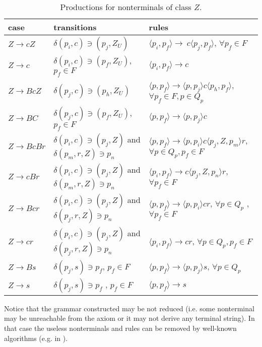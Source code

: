 \documentclass[3p,11pt]{elsarticle}
\begin{document}
\begin{table}[h!]
\caption{\label{productionsZ}Productions for  nonterminals of class $Z$. }
\renewcommand{\arraystretch}{1.3}
\begin{tabular}{l|p{}|p{7cm}}
  case & transitions  & rules \\
  \hline
 $Z\to c Z$ & $\delta(p_i, c)\ni (p_j,Z_U)$ & $\langle p_i, p_f\rangle\to \ c \langle p_j, p_f\rangle$, ${\forall p_f \in F}$ \\

 $Z\to c$ & $\delta(p_i, c)\ni (p_f,Z_U)$, $p_f \in F$ &  $\langle p_i, p_f\rangle\to c$\\

 $Z\to B c Z$      & $\delta(p_j, c)\ni (p_h,Z_U)$ & $\langle p, p_f\rangle\to \langle p, p_j\rangle c \langle p_h, p_f\rangle$, ${\forall p_f\in F, p\in Q_p}$
     \\

  $Z\to B C$    & $\delta(p_j, c)\ni (p_f,Z_U)$, $p_f \in F$  & $\langle p, p_f\rangle\to \langle p, p_j\rangle c$ \\

   $Z\to BcBr$ & $\delta(p_i, c)\ni (p_j, Z)$ and $\delta(p_m, r, Z)\ni p_n$
                   & $\langle p,p_f \rangle  \to \langle p,p_i \rangle c \langle p_j, Z, p_m\rangle r$, ${\forall p \in Q_p,  p_f\in F}$\\


   $Z\to cBr$   &   $\delta(p_i, c)\ni (p_j, Z)$ and $\delta(p_m, r, Z)\ni p_n$
                        & $\langle p_i,p_f \rangle  \to c \langle p_j, Z,p_n \rangle r $, ${\forall p_f\in F}$\\

   $Z\to Bcr$   &   $\delta(p_i, c)\ni (p_j, Z)$ and $\delta(p_j, r, Z)\ni p_n$
                        & $\langle p,p_f \rangle  \to \langle p,p_i \rangle c  r $, ${\forall p \in Q_p}$ , $\forall p_f\in F$\\

  $Z\to cr$   & $\delta(p_i, c)\ni (p_j, Z)$ and $\delta(p_j, r, Z)\ni p_n$
                      & $\langle p_i,p_f \rangle  \to  c  r $, ${\forall p \in Q_p, p_f\in F}$ \\

   $Z\to B s$    &  $\delta(p_j, s)\ni p_f$, $p_f \in F$    &   $\langle p, p_f\rangle\to \langle p, p_j\rangle s$, ${\forall p\in Q_p}$  \\

   $Z\to s$    &   $\delta(p_j, s)\ni p_f$ , $p_f \in F$        &   $\langle p, p_f\rangle\to  s$ \\
\hline
\end{tabular}
\end{table}
 Notice that the grammar  constructed may be not reduced (i.e. some nonterminal may be unreachable from the axiom or it may not derive any terminal string). In that case the useless nonterminals and rules can be removed by well-known algorithms (e.g. in \cite{hopullman:automata}).
\end{document}
